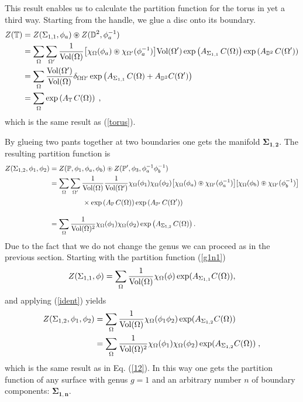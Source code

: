 \documentclass[a4paper,twoside,11pt]{article}
\numberwithin{equation}{section}
\begin{document}
This result enables us to calculate the partition function for the torus in yet a third way. Starting from the handle, we glue a disc onto its boundary. 
\begin{align}
Z(\mathbb{T})&= Z(\Sigma_{1,1},\phi_a)\circledast Z(\mathbb{D}^2,\phi^{-1}_a)\notag\\ 
&=\sum_\Omega\sum_{\Omega^\prime}
\frac{1}{\text{Vol}(\Omega)}\bigl[\chi_\Omega(\phi_a)\circledast\chi_{\Omega'}(\phi_a^{-1})\bigr]
\text{Vol}(\Omega^\prime)\exp\left(A_{\Sigma_{1,1}}\,C(\Omega)\right)\exp\left(A_{\mathbb{D}^2}\,
C(\Omega^\prime)\right)\notag\\
&= \sum_\Omega\frac{\text{Vol}(\Omega^\prime)}{\text{Vol}(\Omega)}\delta_{\Omega\Omega^\prime}
\exp\left(A_{\Sigma_{1,1}}\,C(\Omega)+A_{\mathbb{D}^2}C(\Omega^\prime)\right)\notag\\
&=\sum_\Omega\exp\left(A_{\mathbb{T}}\,C(\Omega)\right)\;,
\end{align}
which is the same result as (\ref{torus}).

By glueing two pants together at two boundaries one gets the manifold $\mathbf{\Sigma_{1,2}}$. 
The resulting partition function is
\begin{align}
Z(\Sigma_{1,2},\phi_1,\phi_2)&=Z(\mathbb{P},\phi_1,\phi_a,\phi_b)\circledast Z(\mathbb{P}^\prime,
\phi_3,\phi^{-1}_a\phi^{-1}_b)\notag\\
 &=\sum_\Omega\sum_{\Omega^\prime}\frac{1}{\Vol(\Omega)}\frac{1}{\Vol(\Omega^\prime)}\chi_\Omega(\phi_1)
\chi_\Omega(\phi_2)\bigl[\chi_\Omega(\phi_a)\circledast\chi_{\Omega'}(\phi_a^{-1})\bigr][\chi_\Omega(\phi_b)
\circledast\chi_{\Omega'}(\phi_b^{-1})\bigr]\notag\\
&\phantom{\sum_\Omega\sum_\Omega\sum_{\Omega^\prime}}\times\exp\left(A_\mathbb{P}\,C(\Omega)\right)
\exp\left(A_\mathbb{P'}\,C(\Omega^\prime)\right)\notag\\
&= \sum_\Omega\frac{1}{\Vol(\Omega)^2}\chi_\Omega(\phi_1)\chi_\Omega(\phi_2)\exp\left(A_{\Sigma_{1,2}}\,
C(\Omega)\right).
\label{12}
\end{align}
Due to the fact that we do not change the genus  we can proceed as in the previous section. Starting  with 
the partition function (\ref{g1n1}) 
\begin{gather*}
Z(\Sigma_{1,1},\phi)  =\sum_\Omega \frac{1}{\text{Vol}(\Omega)}\chi_\Omega(\phi)\exp(A_{\Sigma_{1,1}}C(\Omega)),
\end{gather*}
and applying (\ref{ident}) yields
\begin{align}
Z(\Sigma_{1,2},\phi_1,\phi_2) &= \sum_\Omega \frac{1}{\text{Vol}(\Omega)}\chi_\Omega(\phi_1\phi_2)
\exp(A_{\Sigma_{1,2}}C(\Omega))\notag\\
&= \sum_\Omega \frac{1}{\text{Vol}(\Omega)^2}\chi_\Omega(\phi_1)\chi_\Omega(\phi_2)\exp(A_{\Sigma_{1,2}}C(\Omega))\notag\;,
\end{align}
which is the same result as in Eq. (\ref{12}). In this way one gets the partition function of any surface 
with genus $g=1$ and an arbitrary number $n$ of boundary components: $\mathbf{\Sigma_{1,n}}$.
%
%
\end{document}

